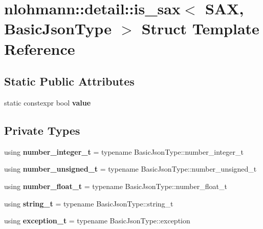 \hypertarget{structnlohmann_1_1detail_1_1is__sax}{}\section{nlohmann\+:\+:detail\+:\+:is\+\_\+sax$<$ S\+AX, Basic\+Json\+Type $>$ Struct Template Reference}
\label{structnlohmann_1_1detail_1_1is__sax}
\subsection*{Static Public Attributes}
\begin{DoxyCompactItemize}
\item 
static constexpr bool {\bfseries value}
\end{DoxyCompactItemize}
\subsection*{Private Types}
\begin{DoxyCompactItemize}
\item 
\mbox{\label{structnlohmann_1_1detail_1_1is__sax_aa9a29390ca9810cee149510f586f5573}} 
using {\bfseries number\+\_\+integer\+\_\+t} = typename Basic\+Json\+Type\+::number\+\_\+integer\+\_\+t
\item 
\mbox{\label{structnlohmann_1_1detail_1_1is__sax_a655c9b8038e51e5b9211e2419118644d}} 
using {\bfseries number\+\_\+unsigned\+\_\+t} = typename Basic\+Json\+Type\+::number\+\_\+unsigned\+\_\+t
\item 
\mbox{\label{structnlohmann_1_1detail_1_1is__sax_a58d3205c8d3c7a01cc330374fa7976c5}} 
using {\bfseries number\+\_\+float\+\_\+t} = typename Basic\+Json\+Type\+::number\+\_\+float\+\_\+t
\item 
\mbox{\label{structnlohmann_1_1detail_1_1is__sax_ad8e2e1427ff43536370b6db6ab83ae50}} 
using {\bfseries string\+\_\+t} = typename Basic\+Json\+Type\+::string\+\_\+t
\item 
\mbox{\label{structnlohmann_1_1detail_1_1is__sax_a6efa516f35d544cc8ce9a954f849fed1}} 
using {\bfseries exception\+\_\+t} = typename Basic\+Json\+Type\+::exception
\end{DoxyCompactItemize}


